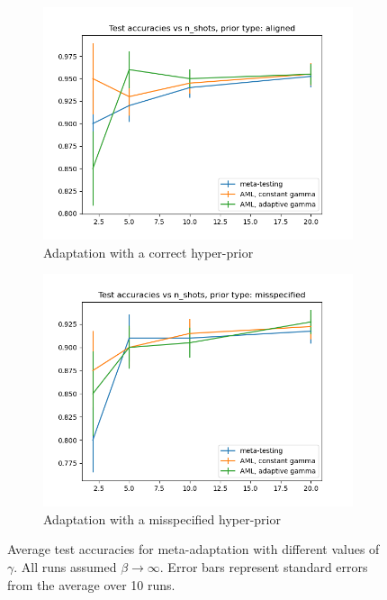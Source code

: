 \documentclass{article}
\theoremstyle{definition}
\begin{document}
\begin{figure}[h!]
	\centering
	\begin{subfigure}[b]{0.49\textwidth}
		\centering
		\includegraphics[width=\textwidth]{test_accuracies_model_aligned}
		\caption{Adaptation with a correct hyper-prior}
	\end{subfigure}
	\hfill
	\begin{subfigure}[b]{0.49\textwidth}
		\centering
		\includegraphics[width=\textwidth]{test_accuracies_model_misspecified}
		\caption{Adaptation with a misspecified hyper-prior}	 	
	\end{subfigure}
	\hfill
	\caption{Average test accuracies for meta-adaptation with different values of $\gamma$. All runs assumed $\beta\rightarrow\infty$. Error bars represent standard errors from the average over 10 runs.}	 
	\label{fig:results-gamma}
\end{figure}
\end{document}
